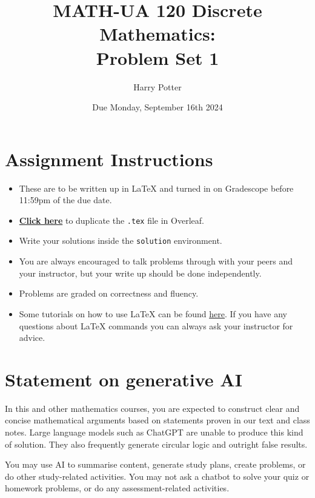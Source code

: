 \documentclass{article}
\title{\textbf{MATH-UA 120 Discrete Mathematics: \\ Problem Set 1}}
\author{%
    Harry Potter %
}
\date{Due Monday, September 16th 2024} %
\theoremstyle{definition}
\begin{document}
\maketitle %

\vfill

\section*{Assignment Instructions}

\begin{itemize}
    \item These are to be written up in \LaTeX{} and turned in on Gradescope before 11:59pm of the due date.
    \item \href{https://bit.ly/4d4g2BH}{\textbf{Click here}} to duplicate the \texttt{.tex} file in Overleaf.
    \item Write your solutions inside the \texttt{solution} environment.
    \item You are always encouraged to talk problems through with your peers and your instructor, but your write up should be done independently.
    \item Problems are graded on correctness and fluency.
    \item Some tutorials on how to use \LaTeX{} can be found \href{https://www.overleaf.com/learn/latex/Tutorials}{\underline{here}}. If you have any questions about \LaTeX{} commands you can always ask your instructor for advice.
\end{itemize}

\vfill

\section*{Statement on generative AI}

In this and other mathematics courses, you are expected to construct clear and concise mathematical arguments based on statements proven in our text and class notes. Large language models such as ChatGPT are unable to produce this kind of solution. They also frequently generate circular logic and outright false results.
 
You may use AI to summarise content, generate study plans, create problems, or do other study-related activities. You may not ask a chatbot to solve your quiz or homework problems, or do any assessment-related activities.
 
\end{document}
